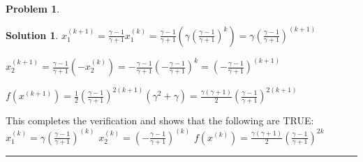 \documentclass{article}
\theoremstyle{definition}
\newtheorem{problem}{Problem}
\def\fline{\rule{0.75\linewidth}{0.5pt}}
\newcommand{\finishline}{\begin{center}\fline\end{center}}
\newtheorem*{solution*}{Solution}
\newenvironment{solution}{\begin{solution*}}{{\finishline} \end{solution*}}
\begin{document}
\begin{problem}
\begin{solution}
$x_1^{(k + 1)} = \frac{\gamma - 1}{\gamma + 1} x_1^{(k)} = \frac{\gamma - 1}{\gamma + 1} (\gamma (\frac{\gamma - 1}{\gamma + 1})^k) = \gamma (\frac{\gamma - 1}{\gamma + 1})^{(k + 1)}$

$x_2^{(k + 1)} = \frac{\gamma - 1}{\gamma + 1} (-x_2^{(k)}) = -\frac{\gamma - 1}{\gamma + 1} (-\frac{\gamma - 1}{\gamma + 1})^k = (-\frac{\gamma - 1}{\gamma + 1})^{(k + 1)}$

$f(x^{(k + 1)}) = \frac{1}{2} (\frac{\gamma - 1}{\gamma + 1})^{2(k + 1)} (\gamma^2 + \gamma) = \frac{\gamma (\gamma + 1)}{2} (\frac{\gamma - 1}{\gamma + 1})^{2(k + 1)}$ \newline 



This completes the verification and shows that the following are TRUE: \newline 
$x_1^{(k)} = \gamma (\frac{\gamma - 1}{\gamma + 1})^{(k)}$ \newline 
$x_2^{(k)} = (-\frac{\gamma - 1}{\gamma + 1})^{(k)}$ \newline 
$f(x^{(k)}) = \frac{\gamma (\gamma + 1)}{2} (\frac{\gamma - 1}{\gamma + 1})^{2k}$

\end{solution}
\end{problem}
\end{document}
